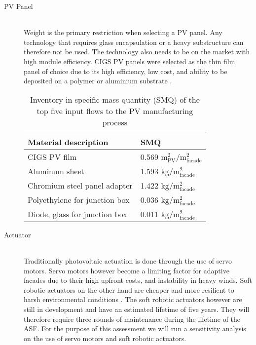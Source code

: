 \begin{description}

\item[PV Panel] \hfill\\
Weight is the primary restriction when selecting a PV panel. Any technology that requires glass encapsulation or a heavy substructure can therefore not be used. The technology also needs to be on the market with high module efficiency. CIGS PV panels were selected as the thin film panel of choice due to its high efficiency, low cost, and ability to be deposited on a polymer or aluminium substrate \cite{chirilua2011highly}. 




\begin{table}[H]
\centering
\begin{tabular}{ll}
\hline
Material description & SMQ \\ \hline
CIGS PV film       	 & 0.569 ${\mathrm{m^2_{PV}/m^2_{facade}}}$\\
Aluminum sheet 	 & 1.593 ${\mathrm{kg/m^2_{facade}}}$\\
Chromium steel panel adapter  & 1.422 ${\mathrm{kg/m^2_{facade}}}$\\
Polyethylene for junction box & 0.036 ${\mathrm{kg/m^2_{facade}}}$\\
Diode, glass for junction box & 0.011 ${\mathrm{kg/m^2_{facade}}}$\\
\hline
\end{tabular}
\caption{Inventory in specific mass quantity (SMQ) of the top five input flows to the PV manufacturing process}
\label{tab:PVinv}
\end{table}

\item[Actuator] \hfill \\
Traditionally photovoltaic actuation is done through the use of servo motors. Servo motors however become a limiting factor for adaptive facades due to their high upfront costs, and instability in heavy winds. Soft robotic actuators on the other hand are cheaper and more resilient to harsh environmental conditions \cite{Svetozarevic2014a}. The soft robotic actuators however are still in development and have an estimated lifetime of five years. They will therefore require three rounds of maintenance during the lifetime of the ASF. For the purpose of this assessment we will run a sensitivity analysis on the use of servo motors and soft robotic actuators. 


\end{description}
